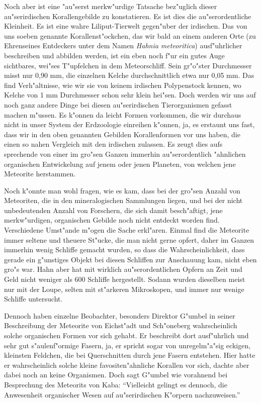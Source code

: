 \documentclass[a4paper, 12pt, oneside]{article}
\begin{document}
Noch aber ist eine "au"serst merkw"urdige Tatsache bez"uglich dieser au"serirdischen Korallengebilde zu konstatieren. Es ist dies die au"serordentliche Kleinheit. Es ist eine wahre Liliput-Tierwelt gegen"uber der irdischen. Das von uns soeben genannte Korallenst"ockchen, das wir bald an einem anderen Orte (zu Ehrenseines Entdeckers unter dem Namen \emph{Hahnia meteoritica}) ausf"uhrlicher beschreiben und abbilden werden, ist ein eben noch f"ur ein gutes Auge sichtbares, wei"ses T"upfelchen in dem Meteorschliff. Sein gr"o"ster Durchmesser misst nur 0,90 mm, die einzelnen Kelche durchschnittlich etwa nur 0,05 mm. Das find Verh"altnisse, wie wir sie von keinem irdischen Polypenstock kennen, wo Kelche von 1 mm Durchmesser schon sehr klein hei"sen. Doch werden wir uns auf noch ganz andere Dinge bei diesen au"serirdischen Tierorganismen gefasst machen m"ussen. Es k"onnen da leicht Formen vorkommen, die wir durchaus nicht in unser System der Erdzoologie einreihen k"onnen, ja, es erstaunt uns fast, dass wir in den oben genannten Gebilden Korallenformen vor uns haben, die einen so nahen Vergleich mit den irdischen zulassen. Es zeugt dies aufs sprechende von einer im gro"sen Ganzen immerhin au"serordentlich "ahnlichen organischen Entwickelung auf jenem oder jenen Planeten, von welchen jene Meteorite herstammen.

Noch k"onnte man wohl fragen, wie es kam, dass bei der gro"sen Anzahl von Meteoriten, die in den mineralogischen Sammlungen liegen, und bei der nicht unbedeutenden Anzahl von Forschern, die sich damit besch"aftigt, jene merkw"urdigen, organischen Gebilde noch nicht entdeckt worden find. Verschiedene Umst"ande m"ogen die Sache erkl"aren. Einmal find die Meteorite immer seltene und theuere St"ucke, die man nicht gerne opfert, daher im Ganzen immerhin wenig Schliffe gemacht wurden, so dass die Wahrscheinlichkeit, dass gerade ein g"unstiges Objekt bei diesen Schliffen zur Anschauung kam, nicht eben gro"s war. Hahn aber hat mit wirklich au"serordentlichen Opfern an Zeit und Geld nicht weniger als 600 Schliffe hergestellt. Sodann wurden dieselben meist nur mit der Loupe, selten mit st"arkeren Mikroskopen, und immer nur wenige Schliffe untersucht.

Dennoch haben einzelne Beobachter, besonders Direktor G"umbel in seiner Beschreibung der Meteorite von Eichst"adt und Sch"oneberg wahrscheinlich solche organischen Formen vor sich gehabt. Er beschreibt dort ausf"uhrlich und sehr gut s"aulenf"ormige Fasern, ja, er spricht sogar von unregelm"a"sig eckigen, kleinsten Feldchen, die bei Querschnitten durch jene Fasern entstehen. Hier hatte er wahrscheinlich solche kleine favositen"ahnliche Korallen vor sich, dachte aber dabei noch an keine Organismen. Doch sagt G"umbel wie vorahnend bei Besprechung des Meteorits von Kaba: "`Vielleicht gelingt es dennoch, die Anwesenheit organischer Wesen auf au"serirdischen K"orpern nachzuweisen."'
\end{document}
